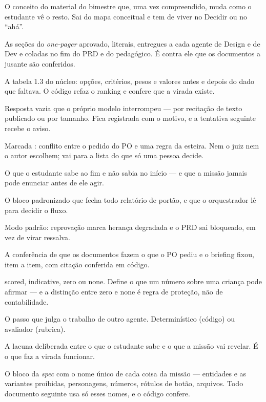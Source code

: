 \documentclass[11pt,a4paper]{article}
\newcommand{\cod}[1]{{\ttfamily\small #1}}
\newcommand{\bolinha}[1]{\tikz[baseline=-0.5ex]{\fill[#1] (0,0) circle (0.33em);}}
\newcommand{\statusDecisao}{\bolinha{unAzul!75!unNavy}}
\begin{document}
\begin{description}[leftmargin=3.5cm,style=sameline,font=\sffamily\bfseries\color{unNavy},itemsep=3pt]
  \item[Conceito limiar] O conceito do material do bimestre que, uma vez compreendido, muda como o estudante vê o resto. Sai do mapa conceitual e tem de viver no Decidir ou no ``ahá''.
  \item[Conteúdo aprovado] As seções do \emph{one-pager} aprovado, literais, entregues a cada agente de Design e de Dev e coladas no fim do PRD e do pedagógico. É contra ele que os documentos a jusante são conferidos.
  \item[Conta da virada] A tabela 1.3 do núcleo: opções, critérios, pesos e valores antes e depois do dado que faltava. O código refaz o ranking e confere que a virada existe.
  \item[Corte do modelo] Resposta vazia que o próprio modelo interrompeu --- por recitação de texto publicado ou por tamanho. Fica registrada com o motivo, e a tentativa seguinte recebe o aviso.
  \item[Decisão do PO] Marcada \statusDecisao: conflito entre o pedido do PO e uma regra da esteira. Nem o juiz nem o autor escolhem; vai para a lista do que só uma pessoa decide.
  \item[Descoberta central] O que o estudante sabe ao fim e não sabia no início --- e que a missão jamais pode enunciar antes de ele agir.
  \item[Envelope JSON] O bloco padronizado que fecha todo relatório de portão, e que o orquestrador lê para decidir o fluxo.
  \item[Esteira estrita] Modo padrão: reprovação marca herança degradada e o PRD sai bloqueado, em vez de virar ressalva.
  \item[Fidelidade] A conferência de que os documentos fazem o que o PO pediu e o briefing fixou, item a item, com citação conferida em código.
  \item[Grau de medida] \cod{scored}, \cod{indicative}, \cod{zero} ou \cod{none}. Define o que um número sobre uma criança pode afirmar --- e a distinção entre \cod{zero} e \cod{none} é regra de proteção, não de contabilidade.
  \item[Gate, portão] O passo que julga o trabalho de outro agente. Determinístico (código) ou avaliador (rubrica).
  \item[\emph{Gap} de informação] A lacuna deliberada entre o que o estudante sabe e o que a missão vai revelar. É o que faz a virada funcionar.
  \item[Glossário canônico] O bloco da \emph{spec} com o nome único de cada coisa da missão --- entidades e as variantes proibidas, personagens, números, rótulos de botão, arquivos. Todo documento seguinte usa só esses nomes, e o código confere.

\end{description}
\end{document}
